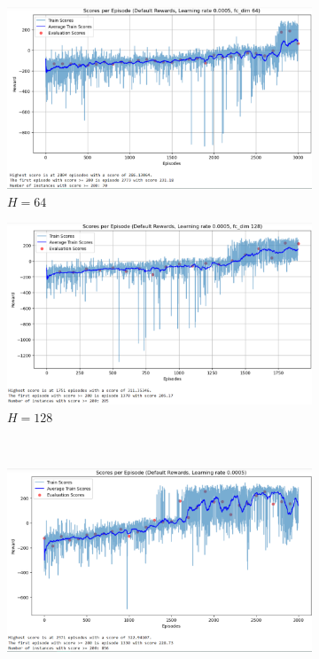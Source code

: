 \documentclass[a4paper, 11pt]{article}
\begin{document}
	\begin{figure}[ht]
		\begin{center}
			\begin{subfigure}{0.48\textwidth}
				\includegraphics[width=\linewidth]{data_policygradient/5fcdim64run.PNG}
				\caption{$H=64$}
				\label{fig:pg_h64}
			\end{subfigure}\hfill 
			\begin{subfigure}{0.48\textwidth}
				\includegraphics[width=\linewidth]{data_policygradient/4fcdim128run.PNG}
				\caption{$H=128$}
				\label{fig:pg_h128}
			\end{subfigure}\\
			\begin{subfigure}{0.48\textwidth}
				\includegraphics[width=\linewidth]{data_policygradient/2learningrate0005run.PNG}

\end{subfigure}
\end{center}
\end{figure}
\end{document}
